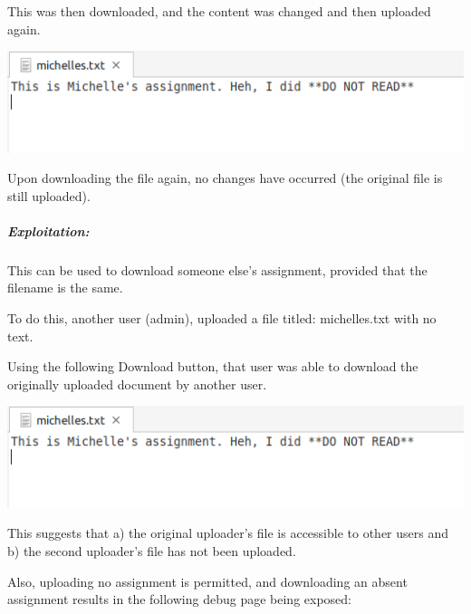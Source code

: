 This was then downloaded, and the content was changed and then uploaded again. 

\begin{center}
    \includegraphics[width = \linewidth]{images/Michelle/michellestxt2.png}
\end{center}

Upon downloading the file again, no changes have occurred (the original file is still uploaded).

\subparagraph{Exploitation:}

This can be used to download someone else's assignment, provided that the filename is the same. 

To do this, another user (admin), uploaded a file titled: michelles.txt with no text.

Using the following Download button, that user was able to download the originally uploaded document by another user.

\begin{center}
    \includegraphics[width = \linewidth]{images/Michelle/michellestxt2.png}
\end{center}

This suggests that a) the original uploader's file is accessible to other users and b) the second uploader's file has not been uploaded.

Also, uploading no assignment is permitted, and downloading an absent assignment results in the following debug page being exposed:

